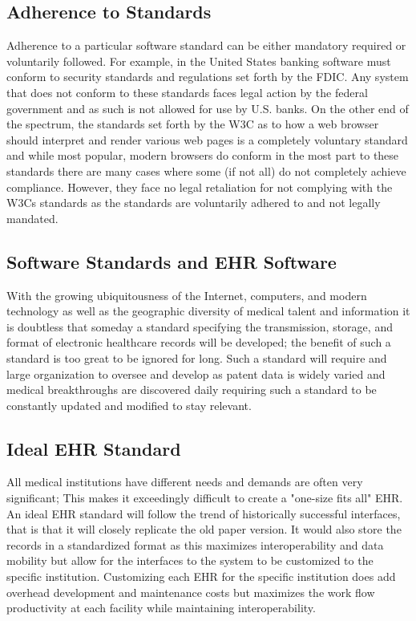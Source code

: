\documentclass[14pt]{article}
\begin{document}

\subsection{Adherence to Standards}
Adherence to a particular software standard can be either mandatory required or voluntarily followed. For example, in the United States banking software must conform to security standards and regulations set forth by the \gls{FDIC}. Any system that does not conform to these standards faces legal action by the federal government and as such is not allowed for use by U.S. banks. On the other end of the spectrum, the standards set forth by the W3C as to how a web browser should interpret and render various web pages is a completely voluntary standard and while most popular, modern browsers do conform in the most part to these standards there are many cases where some (if not all) do not completely achieve compliance. However, they face no legal retaliation for not complying with the \glspl{W3C} standards as the standards are voluntarily adhered to and not legally mandated.

\subsection{Software Standards and EHR Software}
With the growing ubiquitousness of the Internet, computers, and modern technology as well as the geographic diversity of medical talent and information it is doubtless that someday a standard specifying the transmission, storage, and format of electronic healthcare records will be developed; the benefit of such a standard is too great to be ignored for long. Such a standard will require and large organization to oversee and develop as patent data is widely varied and medical breakthroughs are discovered daily requiring such a standard to be constantly updated and modified to stay relevant. 

\subsection{Ideal EHR Standard}
All medical institutions have different needs and demands  are often very significant; This makes it exceedingly difficult to create a "one-size fits all" \gls{EHR}. An ideal \gls{EHR} standard will follow the trend of historically successful interfaces, that is that it will closely replicate the old paper version. It would also store the records in a standardized format as this maximizes interoperability and data mobility but allow for the interfaces to the system to be customized to the specific institution. Customizing each \gls{EHR} for the specific institution does add overhead development and maintenance costs but maximizes the work flow productivity at each facility while maintaining interoperability. 
\end{document}
